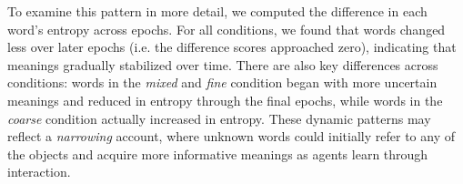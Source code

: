 \documentclass[10pt,letterpaper]{article}
\newcommand{\ndg}[1]{\textcolor{Green}{[ndg: #1]}}
\begin{document}
To examine this pattern in more detail, we computed the difference in each word's entropy across epochs. For all conditions, we found that words changed less over later epochs (i.e. the difference scores approached zero), indicating that meanings gradually stabilized over time. There are also key differences across conditions: words in the \emph{mixed} and \emph{fine} condition began with more uncertain meanings and reduced in entropy through the final epochs, while words in the \emph{coarse} condition actually increased in entropy. %
These dynamic patterns may reflect a \emph{narrowing} account, where unknown words could initially refer to any of the objects and acquire more informative meanings as agents learn through interaction.



\end{document}
